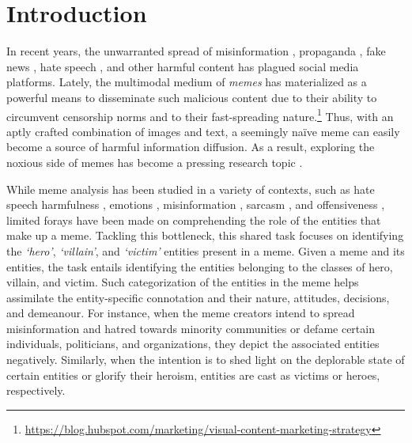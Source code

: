 \documentclass[11pt]{article}
\begin{document}
\section{Introduction}

In recent years, the unwarranted spread of misinformation \cite{wu2019misinformation}, propaganda \cite{da-san-martino-etal-2020-semeval}, fake news \cite{ALDWAIRI2018215}, hate speech \cite{MacAvaney2019Hate}, and other harmful content has plagued social media platforms. Lately, the multimodal medium of \textit{memes} has materialized as a powerful means to disseminate such malicious content due to their ability to circumvent censorship norms \cite{mina2014batman} and to their fast-spreading nature.\footnote{\url{https://blog.hubspot.com/marketing/visual-content-marketing-strategy}} Thus, with an aptly crafted combination of images and text, a seemingly na\"{i}ve meme can easily become a source of harmful information diffusion. As a result, exploring the noxious side of memes has become a pressing research topic \cite{sharma-etal-2020-semeval,pramanick-etal-2021-detecting}.

While meme analysis has been studied in a variety of contexts, such as hate speech \cite{zhou2021multimodal,kiela2020hateful} harmfulness \cite{pramanick-etal-2021-detecting,pramanick-etal-2021-momenta-multimodal}, emotions \cite{sharma-etal-2020-semeval}, misinformation \cite{zidani2021memes}, sarcasm \cite{kumar2019sarc}, and offensiveness \cite{suryawanshi-etal-2020-multimodal}, limited forays have been made on comprehending the role of the entities that make up a meme. Tackling this bottleneck, this shared task focuses on identifying the \textit{`hero'}, \textit{`villain'}, and \textit{`victim'} entities present in a meme. Given a meme and its entities, the task entails identifying the entities belonging to the classes of hero, villain, and victim. Such categorization of the entities in the meme helps assimilate the entity-specific connotation and their nature, attitudes, decisions, and demeanour. For instance, when the meme creators intend to spread misinformation and hatred towards minority communities or defame certain individuals, politicians, and organizations, they depict the associated entities negatively. Similarly, when the intention is to shed light on the deplorable state of certain entities or glorify their heroism, entities are cast as victims or heroes, respectively. 
\end{document}
